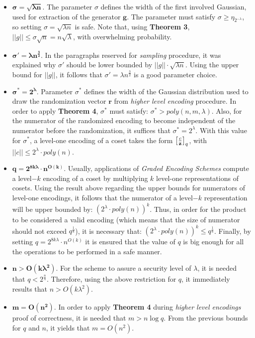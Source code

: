 \begin{itemize}
	\item $\bm{\sigma = \sqrt{\lambda n}}$. The parameter $\sigma$ defines the width of the first involved Gaussian, used for extraction of the generator $\textbf{g}$. The parameter must satisfy $\sigma \geq \eta_{2^{-\lambda}}$, so setting $\sigma = \sqrt{\lambda n}$ is safe. Note that, using \textbf{Theorem 3}, $||g|| \leq \sigma \sqrt{n} = n \sqrt{\lambda}$, with overwhelming probability.
	
	\item $\bm{\sigma' = \lambda n^{\frac{3}{2}}}$. In the paragraphs reserved for \textit{sampling} procedure, it was explained why $\sigma'$ should be lower bounded by $||g|| \cdot \sqrt{\lambda n}$. Using the upper bound for $||g||$, it follows that $\sigma' = \lambda n^{\frac{3}{2}}$ is a good parameter choice.
	
	\item $\bm{\sigma^* = 2^{\lambda}}$. Parameter $\sigma^*$ defines the width of the Gaussian distribution used to draw the randomization vector $\textbf{r}$ from \textit{higher level encoding} procedure. In order to apply \textbf{Theorem 4}, $\sigma^*$ must satisfy: $\sigma^* > poly(n,m,\lambda)$. Also, for the numerator of the randomized encoding to become independent of the numerator before the randomization, it suffices that $\sigma^* = 2^{\lambda}$. With this value for $\sigma^*$, a level-one encoding of a coset takes the form $\big[ \frac{c}{\textbf{z}} \big]_q$, with $||c|| \leq 2^\lambda \cdot poly(n)$.
	
	\item $\bm{q = 2^{8k\lambda} \cdot n^{O(k)}}$. Usually, applications of \textit{Graded Encoding Schemes} compute a level$-k$ encoding of a coset by multiplying $k$ level-one representations of cosets. Using the result above regarding the upper bounds for numerators of level-one encodings, it follows that the numerator of a level$-k$ representation will be upper bounded by: $(2^\lambda \cdot poly(n))^k$. Thus, in order for the product to be considered a valid encoding (which means that the size of numerator should not exceed $q^{\frac{1}{8}}$), it is necessary that: $(2^\lambda \cdot poly(n))^k \leq q^{\frac{1}{8}}$. Finally, by setting $q = 2^{8k\lambda} \cdot n^{O(k)}$ it is ensured that the value of $q$ is big enough for all the operations to be performed in a safe manner.
	
	\item $\bm{n > O(k\lambda^2)}$. For the scheme to assure a security level of $\lambda$, it is needed that $q < 2^{\frac{n}{\lambda}}$. Therefore, using the above restriction for $q$, it immediately results that $n > O(k \lambda^2)$.
	
	\item $\bm{m = O(n^2)}$. In order to apply \textbf{Theorem 4} during \textit{higher level encodings} proof of correctness, it is needed that $m > n \log q$. From the previous bounds for $q$ and $n$, it yields that $m = O(n^2)$.
\end{itemize}

